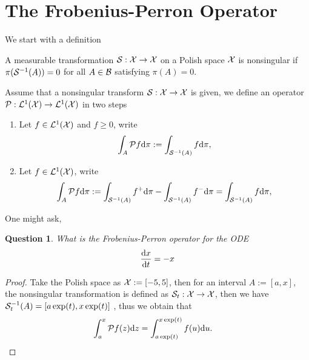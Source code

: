 \documentclass[12pt,a4]{article}
\newtheorem{Q}{Question}
\begin{document}
\section{The Frobenius-Perron Operator}
We start with a definition
\begin{defi}
  A measurable transformation $\mathcal{S}:\mathcal{X}\to\mathcal{X}$ on a Polish space $\mathcal{X}$ is nonsingular if $\pi(\mathcal{S}^{-1} (A))=0$ for all $A\in\mathcal{B}$ satisfying $\pi(A)=0$.
\end{defi}
Assume that a nonsingular transform $\mathcal{S}:\mathcal{X}\to\mathcal{X}$ is given, we define an operator $\mathcal{P}:\mathcal{L}^1(\mathcal{X})\to\mathcal{L}^1(\mathcal{X})$ in two steps
\begin{enumerate}
    \item  Let $f\in\mathcal{L}^1(\mathcal{X})$ and $f\geq 0$, write
    \[
    \int_{A}\mathcal{P} f \mathrm{d} \pi:=\int_{\mathcal{S}^{-1}(A)} f \mathrm{d} \pi,
    \]
    \item Let $f\in\mathcal{L}^1(\mathcal{X})$, write
    \[
    \int_{A}\mathcal{P} f \mathrm{d} \pi:=\int_{\mathcal{S}^{-1}(A)} f^+ \mathrm{d} \pi-\int_{\mathcal{S}^{-1}(A)} f^- \mathrm{d} \pi=\int_{\mathcal{S}^{-1}(A)} f \mathrm{d} \pi,
    \]
\end{enumerate}
One might ask,
\begin{Q}
What is the Frobenius-Perron operator for the ODE
\begin{equation}
    \frac{\mathrm{d} x}{\mathrm{d} t}=-x
\end{equation}
\end{Q}
\begin{proof}
Take the Polish space as $\mathcal{X}:=[-5,5]$, then for an interval $A:=[a,x]$, the nonsingular transformation is defined as $\mathcal{S}_t:\mathcal{X} \to \mathcal{X}$, then we have $\mathcal{S}_t^{-1}(A)=[a\exp(t), x\exp(t)]$ , thus we obtain that 
\begin{align*}
  \int_{a}^{x} \mathcal{P} f(z) \mathrm{d} z&=\int_{a\exp(t)}^{x\exp(t)} f(u) \mathrm{d} u.
\end{align*}
\end{proof}
\end{document}
